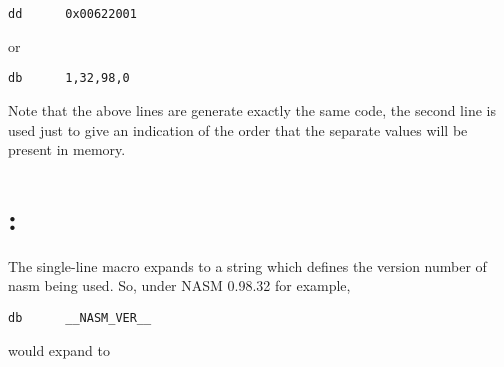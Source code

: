 \begin{lstlisting}
dd      0x00622001
\end{lstlisting}

or

\begin{lstlisting}
db      1,32,98,0
\end{lstlisting}

Note that the above lines are generate exactly the same code, the second
line is used just to give an indication of the order that the separate
values will be present in memory.


\section{: }
\label{sec:stdmacverstr}

The single-line macro  expands to a string which defines
the version number of nasm being used. So, under NASM 0.98.32 for example,

\begin{lstlisting}
db      __NASM_VER__
\end{lstlisting}

would expand to

